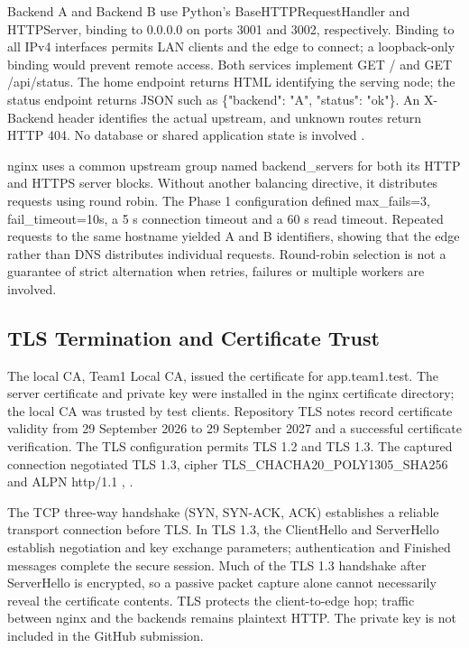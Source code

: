 \documentclass[conference]{IEEEtran}
\begin{document}
Backend A and Backend B use Python's BaseHTTPRequestHandler and
HTTPServer, binding to 0.0.0.0 on ports 3001 and 3002, respectively.
Binding to all IPv4 interfaces permits LAN clients and the edge to
connect; a loopback-only binding would prevent remote access. Both
services implement GET / and GET /api/status. The home endpoint returns
HTML identifying the serving node; the status endpoint returns JSON such
as \{"backend": "A", "status": "ok"\}. An X-Backend header identifies
the actual upstream, and unknown routes return HTTP 404. No database or
shared application state is involved \cite{ref2}.

nginx uses a common upstream group named backend\_servers for both its
HTTP and HTTPS server blocks. Without another balancing directive, it
distributes requests using round robin. The Phase 1 configuration
defined max\_fails=3, fail\_timeout=10s, a 5 s connection timeout and a
60 s read timeout. Repeated requests to the same hostname yielded A and
B identifiers, showing that the edge rather than DNS distributes
individual requests. Round-robin selection is not a guarantee of strict
alternation when retries, failures or multiple workers are involved.

\subsection{TLS Termination and Certificate
Trust}\label{c.-tls-termination-and-certificate-trust}

The local CA, Team1 Local CA, issued the certificate for app.team1.test.
The server certificate and private key were installed in the nginx
certificate directory; the local CA was trusted by test clients.
Repository TLS notes record certificate validity from 29 September 2026
to 29 September 2027 and a successful certificate verification. The TLS
configuration permits TLS 1.2 and TLS 1.3. The captured connection
negotiated TLS 1.3, cipher TLS\_CHACHA20\_POLY1305\_SHA256 and ALPN
http/1.1 \cite{ref2}, \cite{ref6}.

The TCP three-way handshake (SYN, SYN-ACK, ACK) establishes a reliable
transport connection before TLS. In TLS 1.3, the ClientHello and
ServerHello establish negotiation and key exchange parameters;
authentication and Finished messages complete the secure session. Much
of the TLS 1.3 handshake after ServerHello is encrypted, so a passive
packet capture alone cannot necessarily reveal the certificate contents.
TLS protects the client-to-edge hop; traffic between nginx and the
backends remains plaintext HTTP. The private key is not included in the
GitHub submission.
\end{document}
